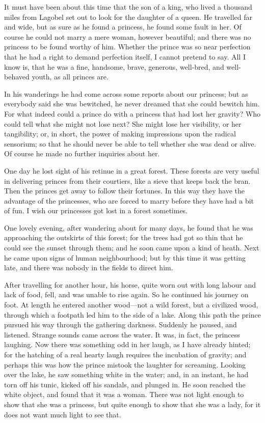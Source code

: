 \documentclass[12pt]{memoir}
\begin{document}
It must have been about this time that the son of a king, who lived a
thousand miles from Lagobel set out to look for the daughter of a
queen.  He travelled far and wide, but as sure as he found a princess,
he found some fault in her.  Of course he could not marry a mere
woman, however beautiful; and there was no princess to be found worthy
of him.  Whether the prince was so near perfection that he had a right
to demand perfection itself, I cannot pretend to say.  All I know is,
that he was a fine, handsome, brave, generous, well-bred, and
well-behaved youth, as all princes are.

In his wanderings he had come across some reports about our princess;
but as everybody said she was bewitched, he never dreamed that she
could bewitch him.  For what indeed could a prince do with a princess
that had lost her gravity?  Who could tell what she might not lose
next?  She might lose her visibility, or her tangibility; or, in
short, the power of making impressions upon the radical sensorium; so
that he should never be able to tell whether she was dead or alive.
Of course he made no further inquiries about her.

One day he lost sight of his retinue in a great forest.  These forests
are very useful in delivering princes from their courtiers, like a
sieve that keeps back the bran.  Then the princes get away to follow
their fortunes.  In this way they have the advantage of the
princesses, who are forced to marry before they have had a bit of fun.
I wish our princesses got lost in a forest sometimes.

One lovely evening, after wandering about for many days, he found that
he was approaching the outskirts of this forest; for the trees had got
so thin that he could see the sunset through them; and he soon came
upon a kind of heath.  Next he came upon signs of human neighbourhood;
but by this time it was getting late, and there was nobody in the
fields to direct him.

After travelling for another hour, his horse, quite worn out with long
labour and lack of food, fell, and was unable to rise again.  So he
continued his journey on foot.  At length he entered another
wood---not a wild forest, but a civilized wood, through which a
footpath led him to the side of a lake.  Along this path the prince
pursued his way through the gathering darkness.  Suddenly he paused,
and listened.  Strange sounds came across the water.  It was, in fact,
the princess laughing.  Now there was something odd in her laugh, as I
have already hinted; for the hatching of a real hearty laugh requires
the incubation of gravity; and perhaps this was how the prince mistook
the laughter for screaming.  Looking over the lake, he saw something
white in the water; and, in an instant, he had torn off his tunic,
kicked off his sandals, and plunged in.  He soon reached the white
object, and found that it was a woman.  There was not light enough to
show that she was a princess, but quite enough to show that she was a
lady, for it does not want much light to see that.
\end{document}
